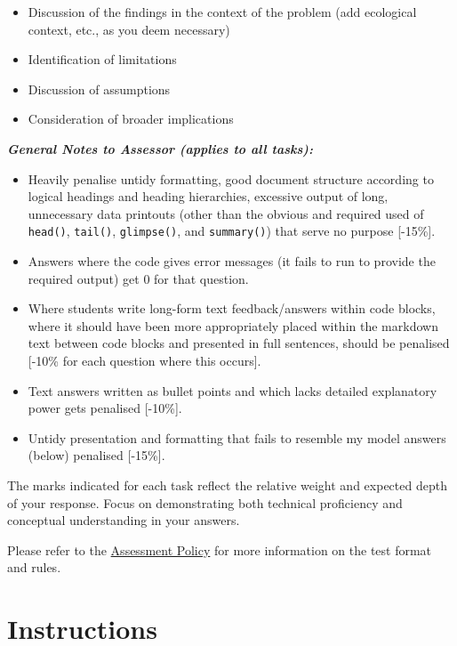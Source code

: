 \documentclass[
  british,
  10pt,
]{article}
\providecommand{\tightlist}{%
  \setlength{\itemsep}{0pt}\setlength{\parskip}{0pt}}
\let\oldtexttt\texttt
\renewcommand{\texttt}[1]{\oldtexttt{\small #1}}
\begin{document}
\begin{enumerate}
  \begin{itemize}
  \tightlist
  \item
    Discussion of the findings in the context of the problem (add
    ecological context, etc., as you deem necessary)
  \item
    Identification of limitations
  \item
    Discussion of assumptions
  \item
    Consideration of broader implications
  \end{itemize}
\end{enumerate}

\textbf{\emph{General Notes to Assessor (applies to all tasks):}}

\begin{itemize}
\tightlist
\item
  Heavily penalise untidy formatting, good document structure according
  to logical headings and heading hierarchies, excessive output of long,
  unnecessary data printouts (other than the obvious and required used
  of \texttt{head()}, \texttt{tail()}, \texttt{glimpse()}, and
  \texttt{summary()}) that serve no purpose {[}-15\%{]}.
\item
  Answers where the code gives error messages (it fails to run to
  provide the required output) get 0 for that question.
\item
  Where students write long-form text feedback/answers within code
  blocks, where it should have been more appropriately placed within the
  markdown text between code blocks and presented in full sentences,
  should be penalised {[}-10\% for each question where this occurs{]}.
\item
  Text answers written as bullet points and which lacks detailed
  explanatory power gets penalised {[}-10\%{]}.
\item
  Untidy presentation and formatting that fails to resemble my model
  answers (below) penalised {[}-15\%{]}.
\end{itemize}

{The marks indicated for each task reflect the relative weight and
expected depth of your response. Focus on demonstrating both technical
proficiency and conceptual understanding in your answers.}

Please refer to the
\href{https://tangledbank.netlify.app/BCB744/BCB744_index.html\#sec-policy}{Assessment
Policy} for more information on the test format and rules.

\section{Instructions}\label{instructions}
\end{document}
